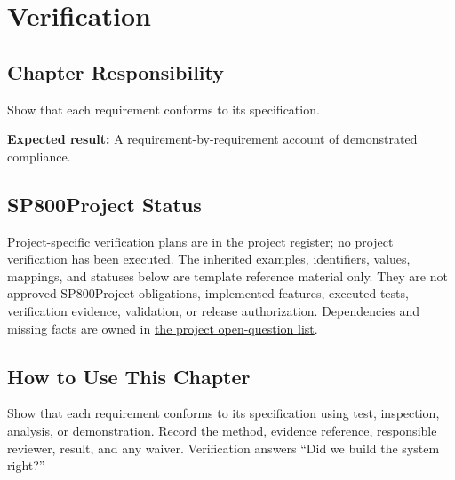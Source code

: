 \chapter{Verification}
\section{Chapter Responsibility}
\label{Section:VerificationResponsibility}
Show that each requirement conforms to its specification.

\noindent\textbf{Expected result:} A requirement-by-requirement account of demonstrated compliance.

\section{SP800Project Status}
\label{Section:SP800StatusVerification}
Project-specific verification plans are in \hyperref[Table:ProjectVerificationRegister]{the project register}; no project verification has been executed. The inherited examples,
identifiers, values, mappings, and statuses below are template reference
material only. They are not approved SP800Project obligations, implemented features,
executed tests, verification evidence, validation, or release authorization.
Dependencies and missing facts are owned in
\hyperref[Section:SP800OpenQuestions]{the project open-question list}.

\section{How to Use This Chapter}
Show that each requirement conforms to its specification using test, inspection, analysis, or demonstration. Record the method, evidence reference, responsible reviewer, result, and any waiver.
Verification answers ``Did we build the system right?''

